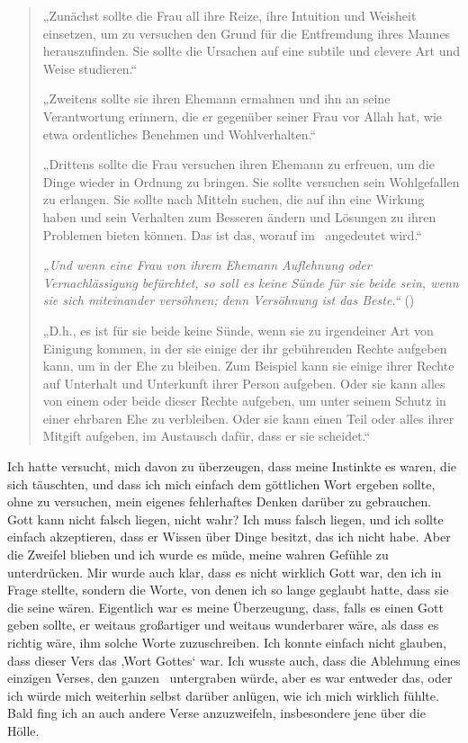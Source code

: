 \documentclass[12pt]{memoir}
\begin{document}
\begin{quote}
„Zunächst sollte die Frau all ihre Reize,
ihre Intuition und Weisheit einsetzen,
um zu versuchen den Grund für die Entfremdung
ihres Mannes herauszufinden.
Sie sollte die Ursachen auf eine subtile
und clevere Art und Weise studieren.“

„Zweitens sollte sie ihren Ehemann ermahnen
und ihn an seine Verantwortung erinnern,
die er gegenüber seiner Frau vor Allah hat,
wie etwa ordentliches Benehmen und Wohlverhalten.“

„Drittens sollte die Frau versuchen ihren Ehemann
zu erfreuen, um die Dinge wieder in Ordnung zu bringen.
Sie sollte versuchen sein Wohlgefallen zu erlangen.
Sie sollte nach Mitteln suchen, die auf ihn eine Wirkung haben
und sein Verhalten zum Besseren ändern
und Lösungen zu ihren Problemen bieten können.
Das ist das, worauf im \Quran\ angedeutet wird.“

\emph{„Und wenn eine Frau von ihrem Ehemann Auflehnung
oder Vernachlässigung befürchtet,
so soll es keine Sünde für sie beide sein,
wenn sie sich miteinander versöhnen;
denn Versöhnung ist das Beste.“} ()

„D.h., es ist für sie beide keine Sünde,
wenn sie zu irgendeiner Art von Einigung kommen,
in der sie einige der ihr gebührenden Rechte aufgeben kann,
um in der Ehe zu bleiben.
Zum Beispiel kann sie einige ihrer Rechte
auf Unterhalt und Unterkunft ihrer Person aufgeben.
Oder sie kann alles von einem oder beide dieser Rechte aufgeben,
um unter seinem Schutz in einer ehrbaren Ehe zu verbleiben.
Oder sie kann einen Teil oder alles ihrer Mitgift aufgeben,
im Austausch dafür, dass er sie scheidet.“
\end{quote}

Ich hatte versucht, mich davon zu überzeugen,
dass meine Instinkte es waren, die sich täuschten,
und dass ich mich einfach dem göttlichen Wort ergeben sollte,
ohne zu versuchen, mein eigenes fehlerhaftes Denken darüber zu gebrauchen.
Gott kann nicht falsch liegen, nicht wahr?
Ich muss falsch liegen, und ich sollte einfach akzeptieren,
dass er Wissen über Dinge besitzt, das ich nicht habe.
Aber die Zweifel blieben und ich wurde es müde,
meine wahren Gefühle zu unterdrücken.
Mir wurde auch klar, dass es nicht wirklich Gott war,
den ich in Frage stellte, sondern die Worte,
von denen ich so lange geglaubt hatte, dass sie die seine wären.
Eigentlich war es meine Überzeugung,
dass, falls es einen Gott geben sollte,
er weitaus großartiger und weitaus wunderbarer wäre,
als dass es richtig wäre, ihm solche Worte zuzuschreiben.
Ich konnte einfach nicht glauben, dass dieser Vers das ‚Wort Gottes‘ war.
Ich wusste auch, dass die Ablehnung eines einzigen Verses,
den ganzen \Quran\ untergraben würde, aber es war entweder das,
oder ich würde mich weiterhin selbst darüber anlügen,
wie ich mich wirklich fühlte.
Bald fing ich an auch andere Verse anzuzweifeln,
insbesondere jene über die Hölle.
\end{document}
